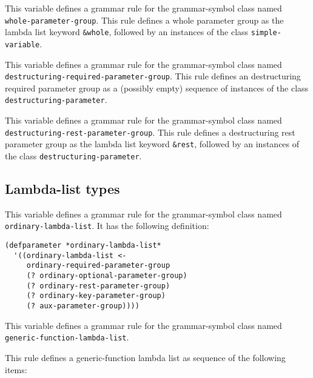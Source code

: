 
This variable defines a grammar rule for the grammar-symbol class
named \texttt{whole-parameter-group}.  This rule defines a whole
parameter group as the lambda list keyword \texttt{\&whole}, followed
by an instances of the class \texttt{simple-variable}.


This variable defines a grammar rule for the grammar-symbol class
named \texttt{destructuring-required-parameter-group}.  This rule
defines an destructuring required parameter group as a (possibly
empty) sequence of instances of the class
\texttt{destructuring-parameter}.


This variable defines a grammar rule for the grammar-symbol class
named \texttt{destructuring-rest-parameter-group}.  This rule defines
a destructuring rest parameter group as the lambda list keyword
\texttt{\&rest}, followed by an instances of the class
\texttt{destructuring-parameter}.

\subsection{Lambda-list types}


This variable defines a grammar rule for the grammar-symbol class
named \texttt{ordinary-lambda-list}.  It has the following definition:

\begin{verbatim}
(defparameter *ordinary-lambda-list*
  '((ordinary-lambda-list <-
     ordinary-required-parameter-group
     (? ordinary-optional-parameter-group)
     (? ordinary-rest-parameter-group)
     (? ordinary-key-parameter-group)
     (? aux-parameter-group))))
\end{verbatim}


This variable defines a grammar rule for the grammar-symbol class
named \texttt{generic-function-lambda-list}.

This rule defines a generic-function lambda list as sequence of the
following items:

